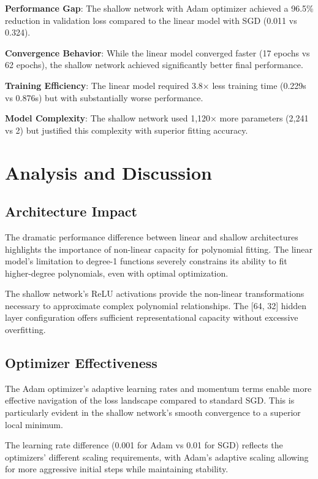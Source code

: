 \documentclass[11pt,twocolumn]{article}
\begin{document}
\textbf{Performance Gap}: The shallow network with Adam optimizer achieved a 96.5\% reduction in validation loss compared to the linear model with SGD (0.011 vs 0.324).

\textbf{Convergence Behavior}: While the linear model converged faster (17 epochs vs 62 epochs), the shallow network achieved significantly better final performance.

\textbf{Training Efficiency}: The linear model required 3.8× less training time (0.229s vs 0.876s) but with substantially worse performance.

\textbf{Model Complexity}: The shallow network used 1,120× more parameters (2,241 vs 2) but justified this complexity with superior fitting accuracy.

\section{Analysis and Discussion}

\subsection{Architecture Impact}

The dramatic performance difference between linear and shallow architectures highlights the importance of non-linear capacity for polynomial fitting. The linear model's limitation to degree-1 functions severely constrains its ability to fit higher-degree polynomials, even with optimal optimization.

The shallow network's ReLU activations provide the non-linear transformations necessary to approximate complex polynomial relationships. The [64, 32] hidden layer configuration offers sufficient representational capacity without excessive overfitting.

\subsection{Optimizer Effectiveness}

The Adam optimizer's adaptive learning rates and momentum terms enable more effective navigation of the loss landscape compared to standard SGD. This is particularly evident in the shallow network's smooth convergence to a superior local minimum.

The learning rate difference (0.001 for Adam vs 0.01 for SGD) reflects the optimizers' different scaling requirements, with Adam's adaptive scaling allowing for more aggressive initial steps while maintaining stability.
\end{document}
